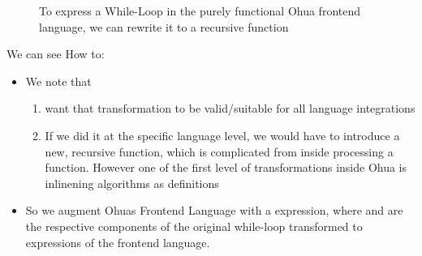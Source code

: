 \begin{figure}[H]
\centering
\tabskip=0pt
\caption{To express a While-Loop in the purely functional Ohua frontend language, we can rewrite it to a recursive function}
\label{fig:WhileTransform}
\end{figure}

We can see 
How to:
\begin{itemize}
    \item We note that 
    \begin{enumerate}
        \item want that transformation to be valid/suitable for all language integrations
        \item If we did it at the specific language level, we would have to introduce a new, recursive function, which is complicated from inside processing a function. However one of the first level of transformations inside Ohua is inlinening algorithms as  definitions  
    \end{enumerate}
    \item So we augment Ohuas Frontend Language with a  expression, where  and  are the respective components of the original while-loop transformed to expressions of the frontend language.
\end{itemize}

